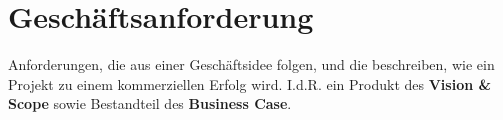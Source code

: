 \section{Geschäftsanforderung}

\begin{tcolorbox}[title=Geschäftsanforderung]
    Anforderungen, die aus einer Geschäftsidee folgen, und die beschreiben, wie ein Projekt zu einem kommerziellen Erfolg wird.
    I.d.R. ein Produkt des \textbf{Vision \& Scope} sowie Bestandteil des \textbf{Business Case}.
\end{tcolorbox}

